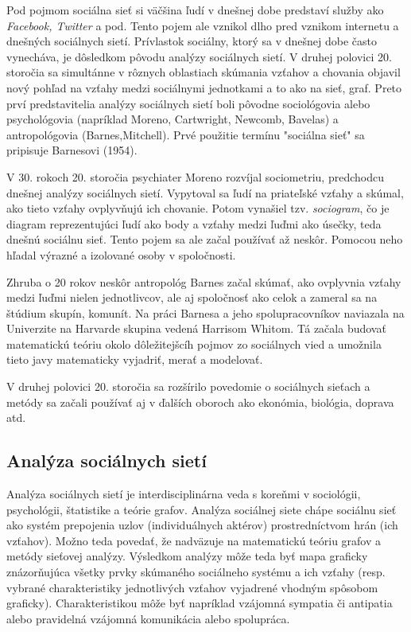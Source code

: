 \documentclass[slovak,master,public,dept460,male,cpdeclaration,oneside]{diploma}
\begin{document}
Pod pojmom sociálna sieť si väčšina ľudí v dnešnej dobe predstaví služby ako \textit{Facebook, Twitter} a pod. Tento pojem ale vznikol dlho pred vznikom internetu a dnešných sociálnych sietí. Prívlastok sociálny, ktorý sa v dnešnej dobe často vynecháva, je dôsledkom pôvodu analýzy sociálnych sietí. V druhej polovici 20. storočia sa simultánne v rôznych oblastiach skúmania vzťahov a chovania objavil nový pohľad na vzťahy medzi sociálnymi jednotkami a to ako na sieť, graf. Preto prví predstavitelia analýzy sociálnych sietí boli pôvodne sociológovia alebo psychológovia (napríklad Moreno, Cartwright, Newcomb, Bavelas) a antropológovia (Barnes,Mitchell). Prvé použitie termínu "sociálna sieť" sa pripisuje Barnesovi (1954).

V 30. rokoch 20. storočia psychiater Moreno rozvíjal sociometriu, predchodcu dnešnej analýzy sociálnych sietí. Vypytoval sa ľudí na priateľské vzťahy a skúmal, ako tieto vzťahy ovplyvňujú ich chovanie. Potom vynašiel tzv. \textit{sociogram}, čo je diagram reprezentujúci ľudí ako body a vzťahy medzi ľuďmi ako úsečky, teda dnešnú sociálnu sieť. Tento pojem sa ale začal používať až neskôr. Pomocou neho hľadal výrazné a izolované osoby v spoločnosti.

Zhruba o 20 rokov neskôr antropológ Barnes začal skúmať, ako ovplyvnia vzťahy medzi ľuďmi nielen jednotlivcov, ale aj spoločnosť ako celok a zameral sa na štúdium skupín, komunít. Na práci Barnesa a jeho spolupracovníkov naviazala na Univerzite na Harvarde skupina vedená Harrisom Whitom. Tá začala budovať matematickú teóriu okolo dôležitejšcíh pojmov zo sociálnych vied a umožnila tieto javy matematicky vyjadriť, merať a modelovať.

V druhej polovici 20. storočia sa rozšírilo povedomie o sociálnych sieťach a metódy sa začali používať aj v ďalších oboroch ako ekonómia, biológia, doprava atd.

\subsection{Analýza sociálnych sietí}

Analýza sociálnych sietí je interdisciplinárna veda s koreňmi v sociológii, psychológii,
štatistike a teórie grafov. Analýza sociálnej siete chápe sociálnu sieť ako systém prepojenia uzlov (individuálnych aktérov) prostredníctvom hrán (ich vzťahov). Možno teda povedať, že nadväzuje na matematickú teóriu grafov a metódy sieťovej analýzy. Výsledkom analýzy môže teda byť mapa graficky znázorňujúca všetky prvky skúmaného sociálneho systému a ich vzťahy (resp. vybrané charakteristiky jednotlivých vzťahov vyjadrené vhodným spôsobom graficky). Charakteristikou môže byť napríklad vzájomná sympatia či antipatia alebo pravidelná vzájomná komunikácia alebo spolupráca.
\end{document}
